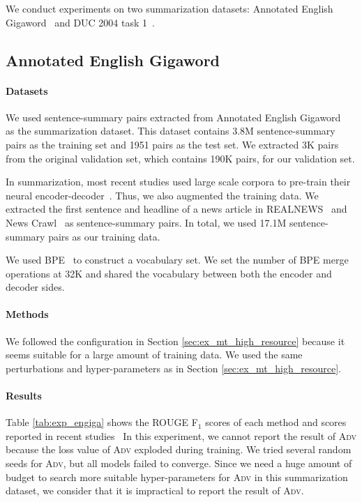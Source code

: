 \documentclass[11pt]{article}
\newcommand{\adv}{\textsc{Adv}}
\begin{document}
We conduct experiments on two summarization datasets: Annotated English Gigaword~\cite{napoles:2012:AG,rush-chopra-weston:2015:EMNLP} and DUC 2004 task 1~\cite{Over:2007:DC:1284916.1285157}.

\subsection{Annotated English Gigaword}
\label{sec:summarization_engiga}
\paragraph{Datasets}
We used sentence-summary pairs extracted from Annotated English Gigaword~\cite{napoles:2012:AG,rush-chopra-weston:2015:EMNLP} as the summarization dataset.
This dataset contains 3.8M sentence-summary pairs as the training set and 1951 pairs as the test set.
We extracted 3K pairs from the original validation set, which contains 190K pairs, for our validation set.

In summarization, most recent studies used large scale corpora to pre-train their neural encoder-decoder~\cite{NEURIPS2019_c20bb2d9,song2019mass,zhang2019pegasus,qi2020prophetnet}.
Thus, we also augmented the training data.
We extracted the first sentence and headline of a news article in REALNEWS~\cite{NEURIPS2019_3e9f0fc9} and News Crawl~\cite{barrault-etal-2019-findings} as sentence-summary pairs.
In total, we used 17.1M sentence-summary pairs as our training data.

We used BPE~\cite{sennrich-etal-2016-neural} to construct a vocabulary set.
We set the number of BPE merge operations at 32K and shared the vocabulary between both the encoder and decoder sides.

\paragraph{Methods}
We followed the configuration in Section \ref{sec:ex_mt_high_resource} because it seems suitable for a large amount of training data.
We used the same perturbations and hyper-parameters as in Section \ref{sec:ex_mt_high_resource}.

\paragraph{Results}
Table \ref{tab:exp_engiga} shows the ROUGE F$_1$ scores of each method and scores reported in recent studies~\cite{NEURIPS2019_c20bb2d9,song2019mass,zhang2019pegasus,qi2020prophetnet}
In this experiment, we cannot report the result of \adv{} because the loss value of \adv{} exploded during training.
We tried several random seeds for \adv{}, but all models failed to converge.
Since we need a huge amount of budget to search more suitable hyper-parameters for \adv{} in this summarization dataset, we consider that it is impractical to report the result of \adv{}.
\end{document}
